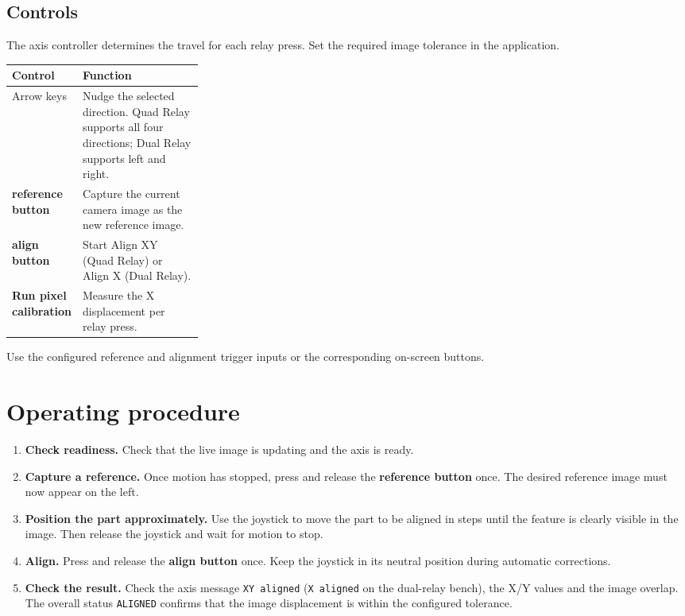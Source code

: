 \documentclass[a4paper,11pt]{article}
\newcommand{\ReferenceButton}{\textbf{reference button}}
\newcommand{\AlignButton}{\textbf{align button}}
\newcommand{\Status}[1]{\texttt{#1}}
\begin{document}
\subsection{Controls}

The axis controller determines the travel for each relay press. Set the
required image tolerance in the application.

\begin{tabularx}{\linewidth}{@{}L{0.28\linewidth}Y@{}}
\toprule
\textbf{Control} & \textbf{Function} \\
\midrule
Arrow keys & Nudge the selected direction. Quad Relay supports all four directions; Dual Relay supports left and right. \\
\ReferenceButton & Capture the current camera image as the new reference image. \\
\AlignButton & Start Align XY (Quad Relay) or Align X (Dual Relay). \\
\textbf{Run pixel calibration} & Measure the X displacement per relay press. \\
\bottomrule
\end{tabularx}

Use the configured reference and alignment trigger inputs or the corresponding on-screen buttons.

\newpage
\section{Operating procedure}

\begin{enumerate}
  \setlength{\itemsep}{0.45em}
  \item \textbf{Check readiness.} Check that the live image is updating and the
  axis is ready.

  \item \textbf{Capture a reference.} Once motion has stopped, press and release
  the \ReferenceButton{} once. The desired reference image must now appear
  on the left.

  \item \textbf{Position the part approximately.} Use the joystick to move
  the part to be aligned in steps until the feature is clearly visible in the
  image. Then release the joystick and wait for motion to stop.

  \item \textbf{Align.} Press and release the \AlignButton{} once.
  Keep the joystick in its neutral position during automatic corrections.

  \item \textbf{Check the result.} Check the axis message
  \Status{XY aligned} (\Status{X aligned} on the dual-relay bench), the X/Y values and the image overlap.
  The overall status \Status{ALIGNED} confirms that the image displacement
  is within the configured tolerance.
\end{enumerate}
\end{document}
